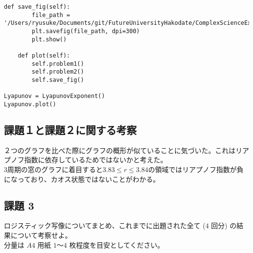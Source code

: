 \documentclass[dvipdfmx,uplatex]{jsarticle}
\begin{document}
\begin{lstlisting}[caption=Pythonによるリアプノフ指数の依存性を示したグラフの描画]
    def save_fig(self):
        file_path = '/Users/ryusuke/Documents/git/FutureUniversityHakodate/ComplexScienceExercise/result/week04_1019163'
        plt.savefig(file_path, dpi=300)
        plt.show()

    def plot(self):
        self.problem1()
        self.problem2()
        self.save_fig()

Lyapunov = LyapunovExponent()
Lyapunov.plot()
\end{lstlisting}

\newpage

\subsection{課題１と課題２に関する考察}
２つのグラフを比べた際にグラフの概形が似ていることに気づいた。これはリアプノフ指数に依存しているためではないかと考えた。\\
3周期の窓のグラフに着目すると$3.83≤ r ≤3.84$の領域ではリアプノフ指数が負になっており、カオス状態ではないことがわかる。

\newpage

\subsection{課題 3}
  ロジスティック写像についてまとめ、これまでに出題された全て ($4$ 回分) の結果について考察せよ。\\
分量は $A4$ 用紙 $1$～$4$ 枚程度を目安としてください。\\
\end{document}
